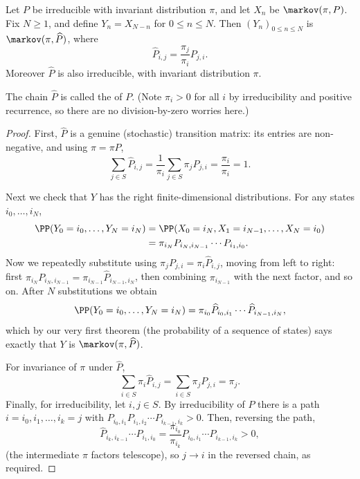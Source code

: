 \documentclass[a4paper]{scrartcl}
\begin{document}
\begin{theorem}
	Let $P$ be irreducible with invariant distribution $\pi$, and let $X_n$ be $\markov(\pi, P)$. Fix $N \geq 1$, and define $Y_n = X_{N - n}$ for $0 \leq n \leq N$. Then $(Y_n)_{0 \leq n \leq N}$ is $\markov(\pi, \widehat{P})$, where
	$$
	\widehat{P}_{i, j} = \frac{\pi_j}{\pi_i} P_{j, i}.
	$$
	Moreover $\widehat{P}$ is also irreducible, with invariant distribution $\pi$.
\end{theorem}

The chain $\widehat{P}$ is called the  of $P$. (Note $\pi_i > 0$ for all $i$ by irreducibility and positive recurrence, so there are no division-by-zero worries here.)

\begin{proof}
	First, $\widehat{P}$ is a genuine (stochastic) transition matrix: its entries are non-negative, and using $\pi = \pi P$,
	$$
	\sum_{j \in S} \widehat{P}_{i, j} = \frac{1}{\pi_i}\sum_{j \in S} \pi_j P_{j, i} = \frac{\pi_i}{\pi_i} = 1.
	$$

	Next we check that $Y$ has the right finite-dimensional distributions. For any states $i_0, \dots, i_N$,
	\begin{align*}
		\PP(Y_0 = i_0, \dots, Y_N = i_N) &= \PP(X_0 = i_N, X_1 = i_{N -1}, \dots, X_N = i_0) \\
		&= \pi_{i_N} P_{i_N, i_{N - 1}} \cdots P_{i_1, i_0}.
	\end{align*}
	Now we repeatedly substitute using $\pi_j P_{j, i} = \pi_i \widehat{P}_{i, j}$, moving from left to right: first $\pi_{i_N}P_{i_N, i_{N -1}} = \pi_{i_{N - 1}}\widehat{P}_{i_{N - 1}, i_N}$, then combining $\pi_{i_{N-1}}$ with the next factor, and so on. After $N$ substitutions we obtain
	$$
	\PP(Y_0 = i_0, \dots, Y_N = i_N) = \pi_{i_0}\widehat{P}_{i_0, i_1} \cdots \widehat{P}_{i_{N - 1}, i_N},
	$$
	which by our very first theorem (the probability of a sequence of states) says exactly that $Y$ is $\markov(\pi, \widehat{P})$.

	For invariance of $\pi$ under $\widehat{P}$,
	$$
	\sum_{i \in S} \pi_i \widehat{P}_{i, j} = \sum_{i \in S} \pi_j P_{j, i} = \pi_j.
	$$
	Finally, for irreducibility, let $i, j \in S$. By irreducibility of $P$ there is a path $i = i_0, i_1, \dots, i_k = j$ with $P_{i_0, i_1}P_{i_1, i_2} \cdots P_{i_{k - 1}, i_k} > 0$. Then, reversing the path,
	$$
	\widehat{P}_{i_k, i_{k -1}}\cdots \widehat{P}_{i_1, i_0} = \frac{\pi_{i_0}}{\pi_{i_k}} P_{i_0, i_1} \cdots P_{i_{k - 1}, i_k} > 0,
	$$
	(the intermediate $\pi$ factors telescope), so $j \rightarrow i$ in the reversed chain, as required.
\end{proof}
\end{document}
